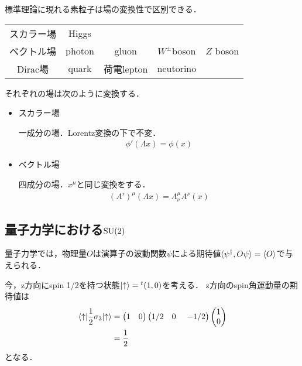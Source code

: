 標準理論に現れる素粒子は場の変換性で区別できる．
\begin{table}[H]
		\centering
		\begin{tabular}{c|cccc}\hline
				スカラー場 & Higgs & & & \\
				ベクトル場 & photon & gluon & $W^{\pm}$boson & $Z$ boson\\
				Dirac場 & quark & 荷電lepton & neutorino & \\\hline
		\end{tabular}
\end{table}
それぞれの場は次のように変換する．
\begin{itemize}
		\item スカラー場

				一成分の場．Lorentz変換の下で不変．
				\begin{align}
						\phi'(\Lambda x) = \phi(x)
				\end{align}
		\item ベクトル場

				四成分の場．$x^{\mu}$と同じ変換をする．
				\begin{align}
						(A')^{\mu}(\Lambda x) = \Lambda^{\mu}_{\nu}A^{\nu}(x)
				\end{align}
\end{itemize}

\subsection{量子力学における$\mathrm{SU}(2)$}
量子力学では，物理量$O$は演算子の波動関数$\psi$による期待値$\langle \psi^{\dagger}, O\psi \rangle = \expval{O}$で与えられる．

今，z方向にspin 1/2を持つ状態$\ket{\uparrow} = {}^{t}(1, 0)$を考える．
z方向のspin角運動量の期待値は
\begin{align}
		\mel{\uparrow}{\frac{1}{2}\sigma_3}{\uparrow}
		&=
		\begin{pmatrix}
				1 & 0
		\end{pmatrix}
		\begin{pmatrix}
				1/2 & 0
				~ & -1/2
		\end{pmatrix}
		\begin{pmatrix}
				1\\
				0
		\end{pmatrix}\\
		&= \frac{1}{2}
\end{align}
となる．

